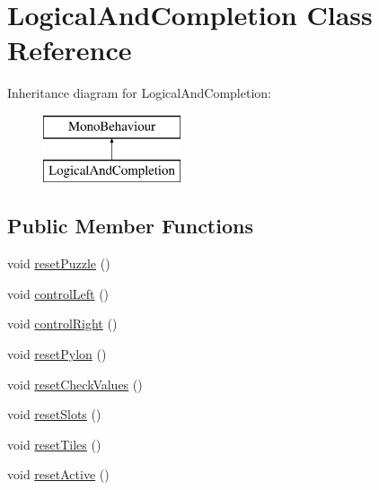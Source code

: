 \hypertarget{class_logical_and_completion}{}\section{Logical\+And\+Completion Class Reference}
\label{class_logical_and_completion}
Inheritance diagram for Logical\+And\+Completion\+:\begin{figure}[H]
\begin{center}
\leavevmode
\includegraphics[height=2.000000cm]{class_logical_and_completion}
\end{center}
\end{figure}
\subsection*{Public Member Functions}
\begin{DoxyCompactItemize}
\item 
void \hyperlink{class_logical_and_completion_a9ed46f831997831283dfd2d8c35d58f9}{reset\+Puzzle} ()
\item 
void \hyperlink{class_logical_and_completion_a6474fb7522f26a6cc7a0a5ce3965fffd}{control\+Left} ()
\item 
void \hyperlink{class_logical_and_completion_a4598f8cd0da38a1ebb2feae2c325f15e}{control\+Right} ()
\item 
void \hyperlink{class_logical_and_completion_aea21ae98d9ca7f00d198c50e176b74eb}{reset\+Pylon} ()
\item 
void \hyperlink{class_logical_and_completion_ac840b6d7276acb039cd91beca9a17130}{reset\+Check\+Values} ()
\item 
void \hyperlink{class_logical_and_completion_af6f46bed91d1c88a40caa1483cb8d67e}{reset\+Slots} ()
\item 
void \hyperlink{class_logical_and_completion_a6a6d723a0e8ecbb8d5c034a0f05748f8}{reset\+Tiles} ()
\item 
void \hyperlink{class_logical_and_completion_ac0555b8b727d4521aa4b469e3a76c74a}{reset\+Active} ()
\end{DoxyCompactItemize}
